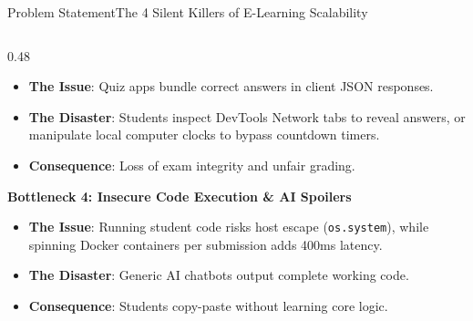 \documentclass[aspectratio=169,10pt]{beamer}
\begin{document}
\begin{frame}[t]{Problem Statement}{The 4 Silent Killers of E-Learning Scalability}
\begin{columns}[t]
\begin{column}{0.48\textwidth}
      \begin{itemize}\setlength{\itemsep}{1.0pt}
        \item {\fontsize{8.0}{9.8}\selectfont \textbf{The Issue}: Quiz apps bundle correct answers in client JSON responses.}
        \item {\fontsize{8.0}{9.8}\selectfont \textbf{The Disaster}: Students inspect DevTools Network tabs to reveal answers, or manipulate local computer clocks to bypass countdown timers.}
        \item {\fontsize{8.0}{9.8}\selectfont \textbf{Consequence}: Loss of exam integrity and unfair grading.}
      \end{itemize}
      \vspace{0.15cm}
      {\fontsize{9.0}{11.0}\selectfont\textbf{\textcolor{KoinexaOrange}{Bottleneck 4: Insecure Code Execution \& AI Spoilers}}}\par\vspace{1.5pt}
      \begin{itemize}\setlength{\itemsep}{1.0pt}
        \item {\fontsize{8.0}{9.8}\selectfont \textbf{The Issue}: Running student code risks host escape (\texttt{os.system}), while spinning Docker containers per submission adds 400ms latency.}
        \item {\fontsize{8.0}{9.8}\selectfont \textbf{The Disaster}: Generic AI chatbots output complete working code.}
        \item {\fontsize{8.0}{9.8}\selectfont \textbf{Consequence}: Students copy-paste without learning core logic.}
      \end{itemize}
    \end{column}
  \end{columns}
\end{frame}
\end{document}
